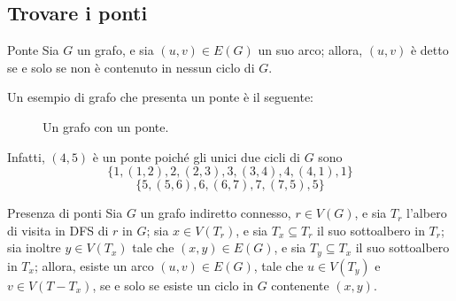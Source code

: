 \documentclass[a4paper, 12pt]{report}
\begin{document}
    \subsection{Trovare i ponti}

    \begin{frameddefn}{Ponte}
        Sia $G$ un grafo, e sia $(u, v) \in E(G)$ un suo arco; allora, $(u, v)$ è detto  se e solo se non è contenuto in nessun ciclo di $G$.
    \end{frameddefn}

    \begin{example}[Ponte]
        Un esempio di grafo che presenta un ponte è il seguente:

        \begin{figure}[H]
            \centering
            \caption{Un grafo con un ponte.}
        \end{figure}

        Infatti, $(4, 5)$ è un ponte poiché gli unici due cicli di $G$ sono $$\{1, (1, 2), 2, (2, 3), 3, (3, 4), 4, (4, 1), 1\}$$ $$\{5, (5, 6), 6, (6, 7), 7, (7, 5), 5\}$$
    \end{example}

    \begin{framedthm}[label={teorema dei ponti}]{Presenza di ponti}
        Sia $G$ un grafo indiretto connesso, $r \in V(G)$, e sia $T_r$ l'albero di visita in DFS di $r$ in $G$; sia $x \in V(T_r)$, e sia $T_x \subseteq T_r$ il suo sottoalbero in $T_r$; sia inoltre $y \in V(T_x)$ tale che $(x, y) \in E(G)$, e sia $T_y \subseteq T_x$ il suo sottoalbero in $T_x$; allora, esiste un arco $(u, v) \in E(G)$, tale che $u \in V(T_y)$ e $v \in V(T - T_x)$, se e solo se esiste un ciclo in $G$ contenente $(x, y)$.
    \end{framedthm}
\end{document}
